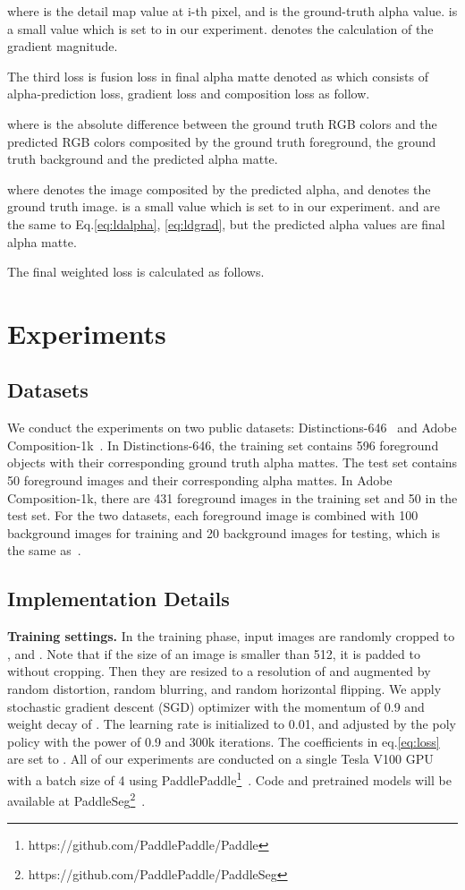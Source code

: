 \documentclass[10pt,twocolumn,letterpaper]{article}
\begin{document}
where  is the detail map value at i-th pixel, and  is the ground-truth alpha value.  is a small value which is set to  in our experiment.  denotes the calculation of the gradient magnitude.

The third loss is fusion loss in final alpha matte denoted as  which consists of alpha-prediction loss, gradient loss and composition loss as follow.

where  is the absolute difference between the ground truth RGB colors and the predicted RGB colors composited by the ground truth foreground, the ground truth background and the predicted alpha matte.



where  denotes the image composited by the predicted alpha, and  denotes the ground truth image.  is a small value which is set to  in our experiment.  and  are the same to Eq.\ref{eq:ldalpha}, \ref{eq:ldgrad}, but the predicted alpha values are final alpha matte.

The final weighted loss is calculated as follows.


\section{Experiments}

\subsection{Datasets}
We conduct the experiments on two public datasets: Distinctions-646~\cite{qiao2020attention} and Adobe Composition-1k~\cite{xu2017deep}. In Distinctions-646, the training set contains 596 foreground objects with their corresponding ground truth alpha mattes. The test set contains 50 foreground images and their corresponding alpha mattes. In Adobe Composition-1k, there are 431 foreground images in the training set and 50 in the test set. For the two datasets, each foreground image is combined with 100 background images for training and 20 background images for testing, which is the same as~\cite{xu2017deep}.

\subsection{Implementation Details}
\label{sec:imp}

\textbf{Training settings.} In the training phase, input images are randomly cropped to ,  and . Note that if the size of an image is smaller than 512, it is padded to  without cropping. Then they are resized to a resolution of  and augmented by random distortion, random blurring, and random horizontal flipping. We apply stochastic gradient descent (SGD) optimizer with the momentum of 0.9 and weight decay of . The learning rate is initialized to 0.01, and adjusted by the poly policy with the power of 0.9 and 300k iterations. The coefficients in eq.\ref{eq:loss} are set to . All of our experiments are conducted on a single Tesla V100 GPU with a batch size of 4 using PaddlePaddle\footnote{https://github.com/PaddlePaddle/Paddle}~\cite{ma2019paddlepaddle}. Code and pretrained models will be available at PaddleSeg\footnote{https://github.com/PaddlePaddle/PaddleSeg}~\cite{liu2021paddleseg}.
\end{document}
